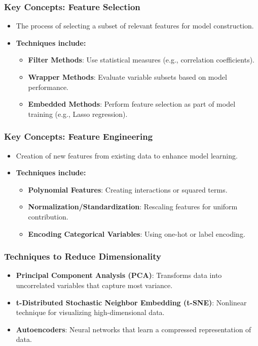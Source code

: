 \documentclass[aspectratio=169]{beamer}
\begin{document}
\begin{frame}[fragile]
    \frametitle{Key Concepts: Feature Selection}
    \begin{itemize}
        \item The process of selecting a subset of relevant features for model construction.
        \item \textbf{Techniques include:}
        \begin{itemize}
            \item \textbf{Filter Methods}: Use statistical measures (e.g., correlation coefficients).
            \item \textbf{Wrapper Methods}: Evaluate variable subsets based on model performance.
            \item \textbf{Embedded Methods}: Perform feature selection as part of model training (e.g., Lasso regression).
        \end{itemize}
    \end{itemize}
\end{frame}

\begin{frame}[fragile]
    \frametitle{Key Concepts: Feature Engineering}
    \begin{itemize}
        \item Creation of new features from existing data to enhance model learning.
        \item \textbf{Techniques include:}
        \begin{itemize}
            \item \textbf{Polynomial Features}: Creating interactions or squared terms.
            \item \textbf{Normalization/Standardization}: Rescaling features for uniform contribution.
            \item \textbf{Encoding Categorical Variables}: Using one-hot or label encoding.
        \end{itemize}
    \end{itemize}
\end{frame}

\begin{frame}[fragile]
    \frametitle{Techniques to Reduce Dimensionality}
    \begin{itemize}
        \item \textbf{Principal Component Analysis (PCA)}: Transforms data into uncorrelated variables that capture most variance.
        \item \textbf{t-Distributed Stochastic Neighbor Embedding (t-SNE)}: Nonlinear technique for visualizing high-dimensional data.
        \item \textbf{Autoencoders}: Neural networks that learn a compressed representation of data.
    \end{itemize}
\end{frame}
\end{document}
